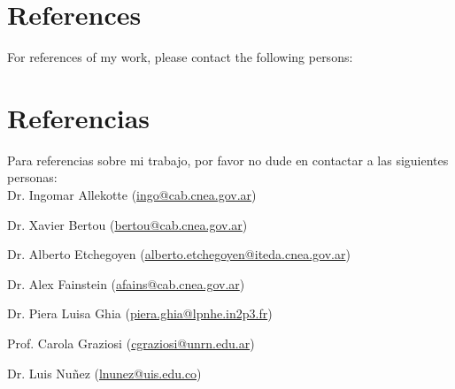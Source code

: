 \ifeng
\section*{References}

For references of my work, please contact the following persons:\\
\else
\section*{Referencias}

Para referencias sobre mi trabajo, por favor no dude en contactar a las siguientes personas:\\

\fi
Dr. Ingomar Allekotte (\href{mailto:ingo@cab.cnea.gov.ar}{ingo@cab.cnea.gov.ar})

Dr. Xavier Bertou (\href{mailto:bertou@cab.cnea.gov.ar}{bertou@cab.cnea.gov.ar})

Dr. Alberto Etchegoyen (\href{mailto:alberto.etchegoyen@iteda.cnea.gov.ar}{alberto.etchegoyen@iteda.cnea.gov.ar})

Dr. Alex Fainstein (\href{mailto:afains@cab.cnea.gov.ar}{afains@cab.cnea.gov.ar})

Dr. Piera Luisa Ghia (\href{mailto:piera.ghia@lpnhe.in2p3.fr}{piera.ghia@lpnhe.in2p3.fr})

Prof. Carola Graziosi (\href{mailto:cgraziosi@unrn.edu.ar}{cgraziosi@unrn.edu.ar})

Dr. Luis Nuñez (\href{mailto:lnunez@uis.edu.co}{lnunez@uis.edu.co})
